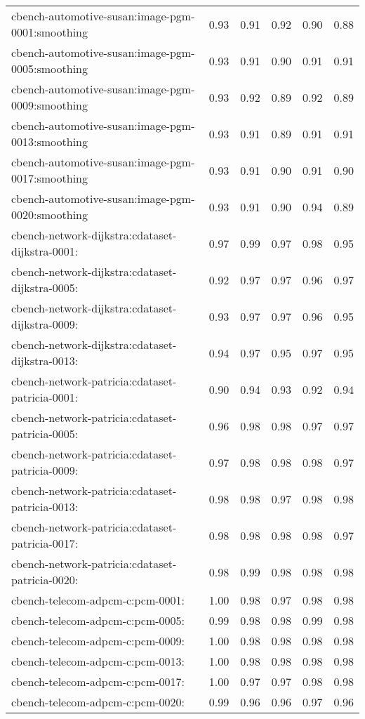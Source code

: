 \begin{table}
\begin{tabular}{lrrrrr}
cbench-automotive-susan:image-pgm-0001:smoothing & 0.93 & 0.91 & 0.92 & 0.90 & 0.88 \\
cbench-automotive-susan:image-pgm-0005:smoothing & 0.93 & 0.91 & 0.90 & 0.91 & 0.91 \\
cbench-automotive-susan:image-pgm-0009:smoothing & 0.93 & 0.92 & 0.89 & 0.92 & 0.89 \\
cbench-automotive-susan:image-pgm-0013:smoothing & 0.93 & 0.91 & 0.89 & 0.91 & 0.91 \\
cbench-automotive-susan:image-pgm-0017:smoothing & 0.93 & 0.91 & 0.90 & 0.91 & 0.90 \\
cbench-automotive-susan:image-pgm-0020:smoothing & 0.93 & 0.91 & 0.90 & 0.94 & 0.89 \\
cbench-network-dijkstra:cdataset-dijkstra-0001: & 0.97 & 0.99 & 0.97 & 0.98 & 0.95 \\
cbench-network-dijkstra:cdataset-dijkstra-0005: & 0.92 & 0.97 & 0.97 & 0.96 & 0.97 \\
cbench-network-dijkstra:cdataset-dijkstra-0009: & 0.93 & 0.97 & 0.97 & 0.96 & 0.95 \\
cbench-network-dijkstra:cdataset-dijkstra-0013: & 0.94 & 0.97 & 0.95 & 0.97 & 0.95 \\
cbench-network-patricia:cdataset-patricia-0001: & 0.90 & 0.94 & 0.93 & 0.92 & 0.94 \\
cbench-network-patricia:cdataset-patricia-0005: & 0.96 & 0.98 & 0.98 & 0.97 & 0.97 \\
cbench-network-patricia:cdataset-patricia-0009: & 0.97 & 0.98 & 0.98 & 0.98 & 0.97 \\
cbench-network-patricia:cdataset-patricia-0013: & 0.98 & 0.98 & 0.97 & 0.98 & 0.98 \\
cbench-network-patricia:cdataset-patricia-0017: & 0.98 & 0.98 & 0.98 & 0.98 & 0.97 \\
cbench-network-patricia:cdataset-patricia-0020: & 0.98 & 0.99 & 0.98 & 0.98 & 0.98 \\
cbench-telecom-adpcm-c:pcm-0001: & 1.00 & 0.98 & 0.97 & 0.98 & 0.98 \\
cbench-telecom-adpcm-c:pcm-0005: & 0.99 & 0.98 & 0.98 & 0.99 & 0.98 \\
cbench-telecom-adpcm-c:pcm-0009: & 1.00 & 0.98 & 0.98 & 0.98 & 0.98 \\
cbench-telecom-adpcm-c:pcm-0013: & 1.00 & 0.98 & 0.98 & 0.98 & 0.98 \\
cbench-telecom-adpcm-c:pcm-0017: & 1.00 & 0.97 & 0.97 & 0.98 & 0.98 \\
cbench-telecom-adpcm-c:pcm-0020: & 0.99 & 0.96 & 0.96 & 0.97 & 0.96 \\

\end{tabular}
\end{table}
